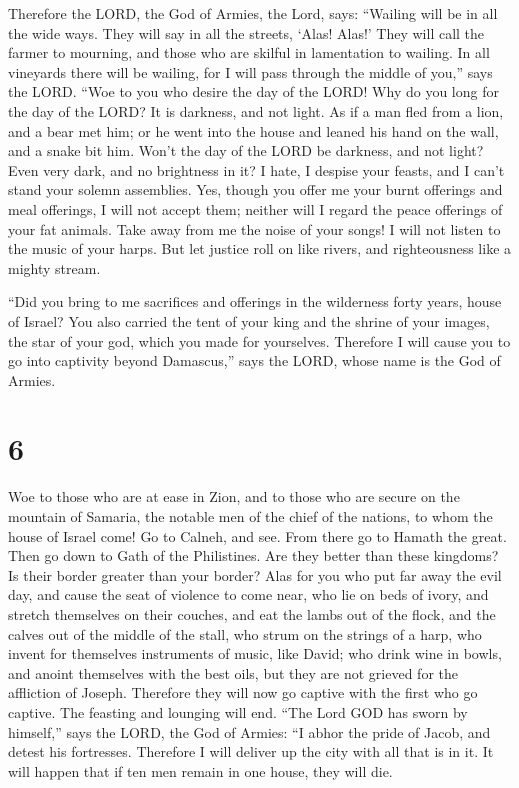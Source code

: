  Therefore the LORD, the God of Armies, the Lord, says:
``Wailing will be in all the wide ways. They will say in all the
streets, `Alas! Alas!' They will call the farmer to mourning, and those
who are skilful in lamentation to wailing.  In all
vineyards there will be wailing, for I will pass through the middle of
you,'' says the LORD.  ``Woe to you who desire the day of
the LORD! Why do you long for the day of the LORD? It is darkness, and
not light.  As if a man fled from a lion, and a bear met
him; or he went into the house and leaned his hand on the wall, and a
snake bit him.  Won't the day of the LORD be darkness,
and not light? Even very dark, and no brightness in it? 
I hate, I despise your feasts, and I can't stand your solemn assemblies.
 Yes, though you offer me your burnt offerings and meal
offerings, I will not accept them; neither will I regard the peace
offerings of your fat animals.  Take away from me the
noise of your songs! I will not listen to the music of your harps.
 But let justice roll on like rivers, and righteousness
like a mighty stream.

 ``Did you bring to me sacrifices and offerings in the
wilderness forty years, house of Israel?  You also
carried the tent of your king and the shrine of your images, the star of
your god, which you made for yourselves.  Therefore I
will cause you to go into captivity beyond Damascus,'' says the LORD,
whose name is the God of Armies.

\hypertarget{section-5}{%
\section{6}\label{section-5}}

 Woe to those who are at ease in Zion, and to those who
are secure on the mountain of Samaria, the notable men of the chief of
the nations, to whom the house of Israel come!  Go to
Calneh, and see. From there go to Hamath the great. Then go down to Gath
of the Philistines. Are they better than these kingdoms? Is their border
greater than your border?  Alas for you who put far away
the evil day, and cause the seat of violence to come near,
 who lie on beds of ivory, and stretch themselves on their
couches, and eat the lambs out of the flock, and the calves out of the
middle of the stall,  who strum on the strings of a harp,
who invent for themselves instruments of music, like David;
 who drink wine in bowls, and anoint themselves with the
best oils, but they are not grieved for the affliction of Joseph.
 Therefore they will now go captive with the first who go
captive. The feasting and lounging will end.  ``The Lord
GOD has sworn by himself,'' says the LORD, the God of Armies: ``I abhor
the pride of Jacob, and detest his fortresses. Therefore I will deliver
up the city with all that is in it.  It will happen that
if ten men remain in one house, they will die.

